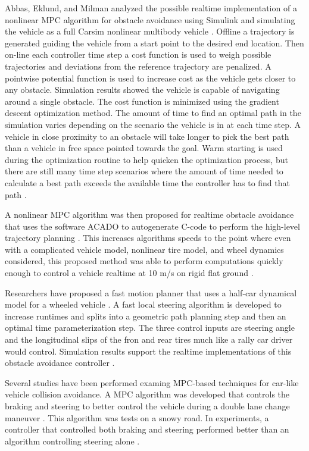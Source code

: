 \documentclass[12pt,onecolumn]{report}
\begin{document}
Abbas, Eklund, and Milman analyzed the possible realtime implementation of a nonlinear MPC algorithm for obstacle avoidance using Simulink and simulating the vehicle as a full Carsim nonlinear multibody vehicle \cite{Abbas&Eklund2012}. Offline a trajectory is generated guiding the vehicle from a start point to the desired end location. Then on-line each controller time step a cost function is used to weigh possible trajectories and deviations from the reference trajectory are penalized. A pointwise potential function is used to increase cost as the vehicle gets closer to any obstacle. Simulation results showed the vehicle is capable of navigating around a single obstacle. The cost function is minimized using the gradient descent optimization method. The amount of time to find an optimal path in the simulation varies depending on the scenario the vehicle is in at each time step. A vehicle in close proximity to an obstacle will take longer to pick the best path than a vehicle in free space pointed towards the goal. Warm starting is used during the optimization routine to help quicken the optimization process, but there are still many time step scenarios where the amount of time needed to calculate a best path exceeds the available time the controller has to find that path \cite{Abbas&Eklund2012}.

A nonlinear MPC algorithm was then proposed for realtime obstacle avoidance that uses the software ACADO to autogenerate C-code to perform the high-level trajectory planning \cite{Frasch&Gray2013}. This increases algorithms speeds to the point where even with a complicated vehicle model, nonlinear tire model, and wheel dynamics considered, this proposed method was able to perform computations quickly enough to control a vehicle realtime at 10 m/s on rigid flat ground \cite{Frasch&Gray2013}.

Researchers have proposed a fast motion planner that uses a half-car dynamical model for a wheeled vehicle \cite{Jeon&Cowlagi2013}. A fast local steering algorithm is developed to increase runtimes and splits into a geometric path planning step and then an optimal time parameterization step. The three control inputs are steering angle and the longitudinal slips of the fron and rear tires much like a rally car driver would control. Simulation results support the realtime implementations of this obstacle avoidance controller \cite{Jeon&Cowlagi2013}.

Several studies have been performed examing MPC-based techniques for car-like vehicle collision avoidance. A MPC algorithm was developed that controls the braking and steering to better control the vehicle during a double lane change maneuver \cite{Falcone2007}. This algorithm was tests on a snowy road. In experiments, a controller that controlled both braking and steering performed better than an algorithm controlling steering alone \cite{Falcone2007}.
\end{document}
